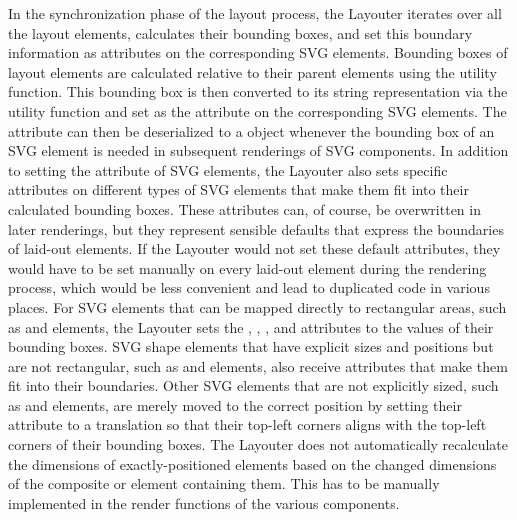 In the synchronization phase of the layout process, the Layouter iterates over all the layout elements, calculates their bounding boxes, and set this boundary information as attributes on the corresponding SVG elements.
Bounding boxes of layout elements are calculated relative to their parent elements using the  utility function.
This bounding box is then converted to its string representation via the  utility function and set as the  attribute on the corresponding SVG elements. 
The  attribute can then be deserialized to a  object whenever the bounding box of an SVG element is needed in subsequent renderings of SVG components. 
In addition to setting the  attribute of SVG elements, the Layouter also sets specific attributes on different types of SVG elements that make them fit into their calculated bounding boxes.
These attributes can, of course, be overwritten in later renderings, but they represent sensible defaults that express the boundaries of laid-out elements.
If the Layouter would not set these default attributes, they would have to be set manually on every laid-out element during the rendering process, which would be less convenient and lead to duplicated code in various places.
For SVG elements that can be mapped directly to rectangular areas, such as  and  elements, the Layouter sets the , , , and  attributes to the values of their bounding boxes.
SVG shape elements that have explicit sizes and positions but are not rectangular, such as  and  elements, also receive attributes that make them fit into their boundaries. 
Other SVG elements that are not explicitly sized, such as  and  elements, are merely moved to the correct position by setting their  attribute to a translation so that their top-left corners aligns with the top-left corners of their bounding boxes. 
The Layouter does not automatically recalculate the dimensions of exactly-positioned elements based on the changed dimensions of the composite  or  element containing them.
This has to be manually implemented in the render functions of the various components.

